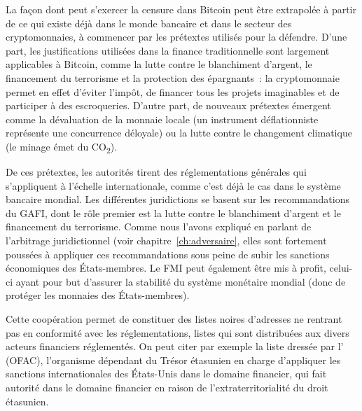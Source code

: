 La façon dont peut s'exercer la censure dans Bitcoin peut être extrapolée à partir de ce qui existe déjà dans le monde bancaire et dans le secteur des cryptomonnaies, à commencer par les prétextes utilisés pour la défendre. D'une part, les justifications utilisées dans la finance traditionnelle sont largement applicables à Bitcoin, comme la lutte contre le blanchiment d'argent, le financement du terrorisme et la protection des épargnants~: la cryptomonnaie permet en effet d'éviter l'impôt, de financer tous les projets imaginables et de participer à des escroqueries. D'autre part, de nouveaux prétextes émergent comme la dévaluation de la monnaie locale (un instrument déflationniste représente une concurrence déloyale) ou la lutte contre le changement climatique (le minage émet du CO\textsubscript{2}).

De ces prétextes, les autorités tirent des réglementations générales qui s'appliquent à l'échelle internationale, comme c'est déjà le cas dans le système bancaire mondial. Les différentes juridictions se basent sur les recommandations du GAFI, dont le rôle premier est la lutte contre le blanchiment d'argent et le financement du terrorisme. Comme nous l'avons expliqué en parlant de l'arbitrage juridictionnel (voir chapitre~\ref{ch:adversaire}, elles sont fortement poussées à appliquer ces recommandations sous peine de subir les sanctions économiques des États-membres. Le FMI peut également être mis à profit, celui-ci ayant pour but d'assurer la stabilité du système monétaire mondial (donc de protéger les monnaies des États-membres). %

Cette coopération permet de constituer des listes noires d'adresses ne rentrant pas en conformité avec les réglementations, listes qui sont distribuées aux divers acteurs financiers réglementés. On peut citer par exemple la liste dressée par l' (OFAC), l'organisme dépendant du Trésor étasunien en charge d'appliquer les sanctions internationales des États-Unis dans le domaine financier, qui fait autorité dans le domaine financier en raison de l'extraterritorialité du droit étasunien.

